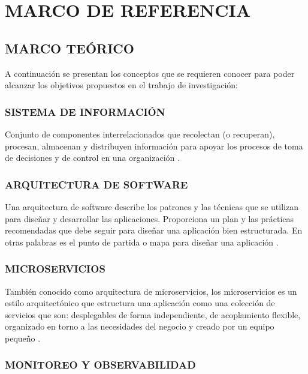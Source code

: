 \documentclass[a4paper,12pt]{article}
\begin{document}
\section{\large MARCO DE REFERENCIA}
\subsection{\normalsize MARCO TEÓRICO}
A continuación se presentan los conceptos que se requieren conocer para poder alcanzar los objetivos propuestos en el trabajo de investigación:

\subsubsection{\small SISTEMA DE INFORMACIÓN}    

Conjunto de componentes interrelacionados que recolectan (o recuperan), procesan, almacenan y 
distribuyen información para  apoyar los procesos de toma de decisiones y de control en una 
organización \cite{laudon&laudon}.

\subsubsection{\small ARQUITECTURA DE SOFTWARE}

Una arquitectura de software describe los patrones y las técnicas que se utilizan para diseñar y 
desarrollar las aplicaciones. Proporciona un plan y las prácticas recomendadas que debe seguir para 
diseñar una aplicación bien estructurada. En otras palabras es el punto de partida o mapa para diseñar 
una aplicación \cite{redhat_arquitectura}. 

\subsubsection{\small MICROSERVICIOS}

También conocido como arquitectura de microservicios, los microservicios es un estilo arquitectónico
que estructura una aplicación como una colección de servicios que son: desplegables de forma independiente, 
de acoplamiento flexible, organizado en torno a las necesidades del negocio y creado por un equipo 
pequeño \cite{microservices}.  

\subsubsection{\small MONITOREO Y OBSERVABILIDAD}
\end{document}
